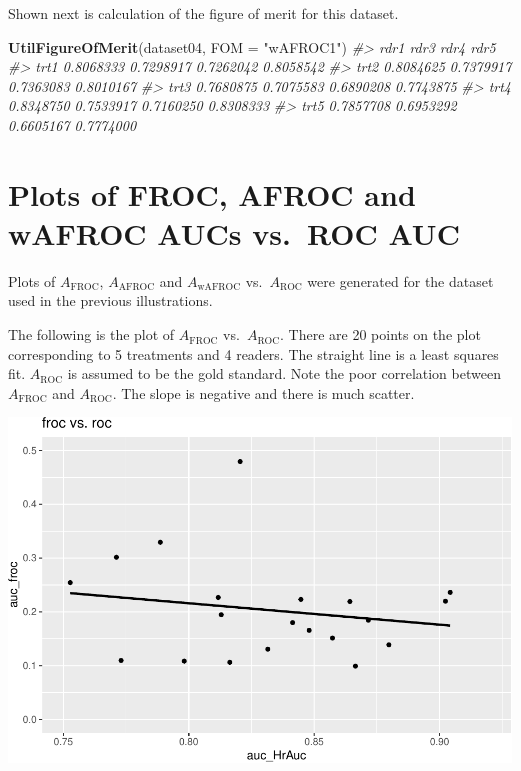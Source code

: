 \documentclass[
]{book}
\newenvironment{Shaded}{\begin{snugshade}}{\end{snugshade}}
\newcommand{\CommentTok}[1]{\textcolor[rgb]{0.56,0.35,0.01}{\textit{#1}}}
\newcommand{\DataTypeTok}[1]{\textcolor[rgb]{0.13,0.29,0.53}{#1}}
\newcommand{\KeywordTok}[1]{\textcolor[rgb]{0.13,0.29,0.53}{\textbf{#1}}}
\newcommand{\NormalTok}[1]{#1}
\newcommand{\StringTok}[1]{\textcolor[rgb]{0.31,0.60,0.02}{#1}}
\begin{document}
Shown next is calculation of the figure of merit for this dataset.

\begin{Shaded}
\begin{Highlighting}[]
\KeywordTok{UtilFigureOfMerit}\NormalTok{(dataset04, }\DataTypeTok{FOM =} \StringTok{"wAFROC1"}\NormalTok{)}
\CommentTok{#>           rdr1      rdr3      rdr4      rdr5}
\CommentTok{#> trt1 0.8068333 0.7298917 0.7262042 0.8058542}
\CommentTok{#> trt2 0.8084625 0.7379917 0.7363083 0.8010167}
\CommentTok{#> trt3 0.7680875 0.7075583 0.6890208 0.7743875}
\CommentTok{#> trt4 0.8348750 0.7533917 0.7160250 0.8308333}
\CommentTok{#> trt5 0.7857708 0.6953292 0.6605167 0.7774000}
\end{Highlighting}
\end{Shaded}

\hypertarget{empirical-plots}{%
\section{Plots of FROC, AFROC and wAFROC AUCs vs.~ROC AUC}\label{empirical-plots}}

Plots of \(A_{\text{FROC}}\), \(A_{\text{AFROC}}\) and \(A_{\text{wAFROC}}\) vs.~\(A_{\text{ROC}}\) were generated for the dataset used in the previous illustrations.

The following is the plot of \(A_{\text{FROC}}\) vs.~\(A_{\text{ROC}}\). There are 20 points on the plot corresponding to 5 treatments and 4 readers. The straight line is a least squares fit. \(A_{\text{ROC}}\) is assumed to be the gold standard. Note the poor correlation between \(A_{\text{FROC}}\) and \(A_{\text{ROC}}\). The slope is negative and there is much scatter.

\includegraphics{03-empirical_files/figure-latex/unnamed-chunk-19-1.pdf}
\end{document}

